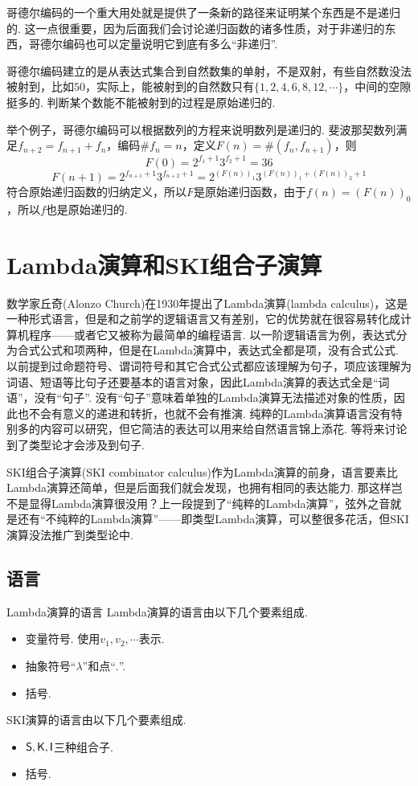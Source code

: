 哥德尔编码的一个重大用处就是提供了一条新的路径来证明某个东西是不是递归的. 这一点很重要，因为后面我们会讨论递归函数的诸多性质，对于非递归的东西，哥德尔编码也可以定量说明它到底有多么“非递归”. 

哥德尔编码建立的是从表达式集合到自然数集的单射，不是双射，有些自然数没法被射到，比如\(50\)，实际上，能被射到的自然数只有\(\{1,2,4,6,8,12,\cdots\}\)，中间的空隙挺多的. 判断某个数能不能被射到的过程是原始递归的.

\begin{note}
    举个例子，哥德尔编码可以根据数列的方程来说明数列是递归的. 斐波那契数列满足\(f_{n+2}=f_{n+1}+f_n\)，编码\(\#f_n=n\)，定义\(F(n) = \#(f_n,f_{n+1})\)，则
    \[F(0) = 2^{f_1+1}3^{f_2+1}=36\]
    \[F(n+1) = 2^{f_{n+1}+1}3^{f_{n+2}+1} = 2^{(F(n))_1}3^{(F(n))_1+(F(n))_2+1}\]
    符合原始递归函数的归纳定义，所以\(F\)是原始递归函数，由于\(f(n)=(F(n))_0\)，所以\(f\)也是原始递归的.
\end{note}

\section{Lambda演算和SKI组合子演算}

数学家丘奇(Alonzo Church)在1930年提出了Lambda演算(lambda calculus)，这是一种形式语言，但是和之前学的逻辑语言又有差别，它的优势就在很容易转化成计算机程序——或者它又被称为最简单的编程语言. 以一阶逻辑语言为例，表达式分为合式公式和项两种，但是在Lambda演算中，表达式全都是项，没有合式公式. 以前提到过命题符号、谓词符号和其它合式公式都应该理解为句子，项应该理解为词语、短语等比句子还要基本的语言对象，因此Lambda演算的表达式全是“词语”，没有“句子”. 没有“句子”意味着单独的Lambda演算无法描述对象的性质，因此也不会有意义的递进和转折，也就不会有推演. 纯粹的Lambda演算语言没有特别多的内容可以研究，但它简洁的表达可以用来给自然语言锦上添花. 等将来讨论到了类型论才会涉及到句子.

SKI组合子演算(SKI combinator calculus)作为Lambda演算的前身，语言要素比Lambda演算还简单，但是后面我们就会发现，也拥有相同的表达能力. 那这样岂不是显得Lambda演算很没用？上一段提到了“纯粹的Lambda演算”，弦外之音就是还有“不纯粹的Lambda演算”——即类型Lambda演算，可以整很多花活，但SKI演算没法推广到类型论中.

\subsection{语言}

\begin{definition}{Lambda演算的语言}
    Lambda演算的语言由以下几个要素组成.
    \begin{itemize}
        \item 变量符号. 使用\(v_1,v_2,\cdots\)表示.
        \item 抽象符号“\(\lambda\)”和点“\(.\)”.
        \item 括号.
    \end{itemize}
    SKI演算的语言由以下几个要素组成.
    \begin{itemize}
        \item \({\sf S,K,I}\)三种组合子.
        \item 括号.
    \end{itemize}
\end{definition}

